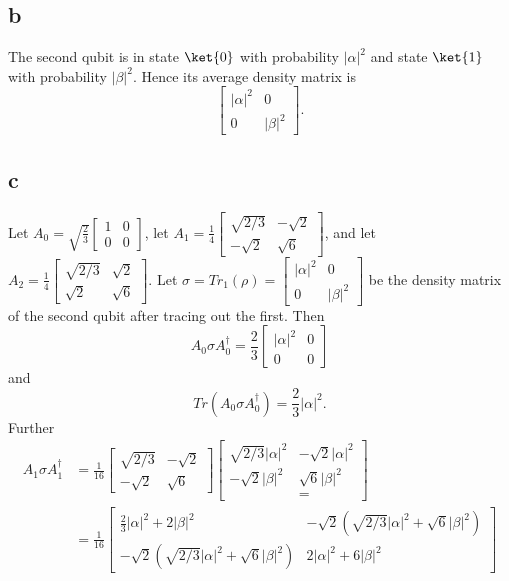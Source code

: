 \documentclass[letterpaper,12pt,oneside,onecolumn]{article}
\begin{document}
\subsection{b}
The second qubit is in state $\ket{0}$ with probability $|\alpha|^2$ and state $\ket{1}$ with probability $|\beta|^2$. Hence its average density matrix is
$$ \begin{bmatrix}
|\alpha|^2 & 0 \\
0 & |\beta|^2
\end{bmatrix}.$$

\subsection{c}
Let $A_0 = \sqrt{\frac{2}{3}}\begin{bmatrix}
1 & 0 \\ 0 & 0
\end{bmatrix}$, let $A_1 = \frac{1}{4} \begin{bmatrix}
\sqrt{2/3} & -\sqrt{2} \\ -\sqrt{2} & \sqrt{6}
\end{bmatrix}$, and let $A_2 = \frac{1}{4} \begin{bmatrix}
\sqrt{2/3} & \sqrt{2} \\ \sqrt{2} & \sqrt{6}
\end{bmatrix}.$
Let $\sigma = Tr_1(\rho) = \begin{bmatrix}
|\alpha|^2 & 0 \\
0 & |\beta|^2\end{bmatrix}$ be the density matrix of the second qubit after tracing out the first. Then
$$A_0\sigma A_0^\dagger = \frac{2}{3}\begin{bmatrix}
|\alpha|^2 & 0 \\ 0 & 0
\end{bmatrix}$$
and
$$Tr(A_0\sigma A_0^\dagger) = \frac{2}{3}|\alpha|^2.$$
Further
\begin{align*}A_1\sigma A_1^\dagger &= \frac{1}{16} \begin{bmatrix}
\sqrt{2/3} & -\sqrt{2} \\ -\sqrt{2} & \sqrt{6}
\end{bmatrix}\begin{bmatrix}
\sqrt{2/3}|\alpha|^2 & -\sqrt{2}|\alpha|^2 \\ -\sqrt{2}|\beta|^2 & \sqrt{6}|\beta|^2 \\&= 
\end{bmatrix}\\&= \frac{1}{16}\begin{bmatrix}
\frac{2}{3}|\alpha|^2 + 2|\beta|^2 & -\sqrt{2}(\sqrt{2/3}|\alpha|^2 + \sqrt{6}|\beta|^2) \\
 -\sqrt{2}(\sqrt{2/3}|\alpha|^2 + \sqrt{6}|\beta|^2) & 2|\alpha|^2 + 6|\beta|^2
\end{bmatrix}\end{align*}
\end{document}
